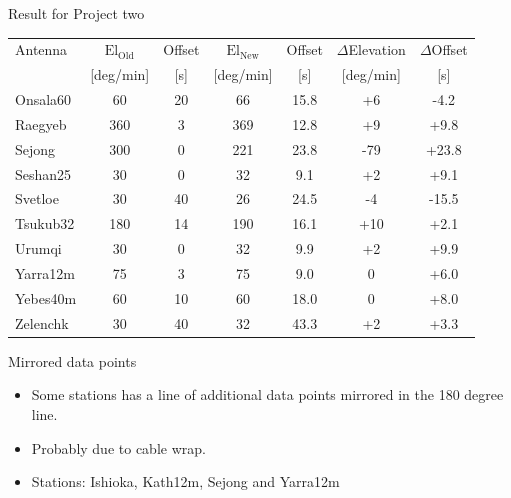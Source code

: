 \documentclass{beamer}
\begin{document}
     \begin{frame}{Result for Project two}
        \tabcolsep=0.15cm
        \begin{tabular}{l | c c | c c | c c}
            Antenna & $\text{El}_{\text{Old}}$ & Offset & $\text{El}_{\text{New}}$ & Offset & $\Delta$Elevation & $\Delta$Offset \\ [-8pt]
                    & \tiny{[deg/min]}& \tiny{[s]}&\tiny{[deg/min]}&\tiny{[s]}&\tiny{[deg/min]}& \tiny{[s]} \\
            \hline
            Onsala60          &  60 &  20 &  66 & 15.8 &  +6 & -4.2 \\
            Raegyeb           & 360 &   3 & 369 & 12.8 &  +9 & +9.8 \\
            Sejong            & 300 &   0 & 221 & 23.8 & -79 &+23.8 \\
            Seshan25          &  30 &   0 &  32 &  9.1 &  +2 & +9.1 \\
            Svetloe           &  30 &  40 &  26 & 24.5 &  -4 &-15.5 \\
            Tsukub32          & 180 &  14 & 190 & 16.1 & +10 & +2.1 \\
            Urumqi            &  30 &   0 &  32 &  9.9 &  +2 & +9.9 \\
            Yarra12m          &  75 &   3 &  75 &  9.0 &   0 & +6.0 \\
            Yebes40m          &  60 &  10 &  60 & 18.0 &   0 & +8.0 \\
            Zelenchk          &  30 &  40 &  32 & 43.3 &  +2 & +3.3 \\
        \end{tabular}
    \end{frame}
   \begin{frame}{Mirrored data points}
        \begin{itemize}[<+-|alert@+>]
            \item Some stations has a line of additional data points mirrored
                  in the 180 degree line.
            \item Probably due to cable wrap.
            \item Stations: Ishioka, Kath12m, Sejong and Yarra12m
        \end{itemize}
    \end{frame}
\end{document}
